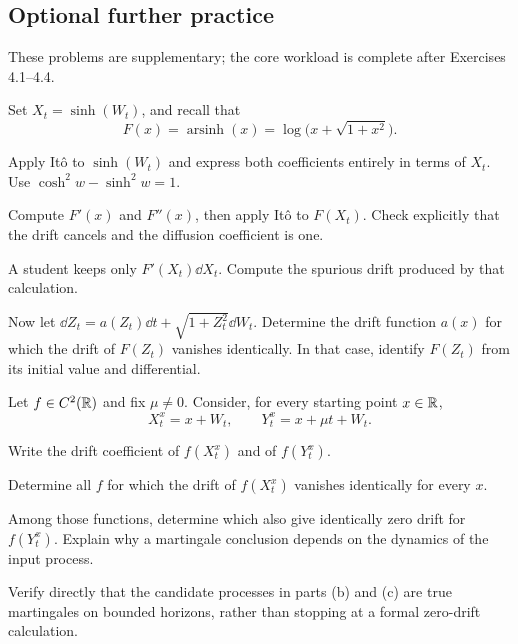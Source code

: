 \subsection*{Optional further practice}
\noindent These problems are supplementary; the core workload is complete after Exercises 4.1--4.4.
\setcounter{exercise}{4}
\begin{exercise}
Set \(X_t=\sinh(W_t)\), and recall that
\[
F(x)=\operatorname{arsinh}(x)=\log\bigl(x+\sqrt{1+x^2}\bigr).
\]
\begin{exparts}
  \item Apply It\^o to \(\sinh(W_t)\) and express both coefficients
  entirely in terms of \(X_t\). Use \(\cosh^2 w-\sinh^2 w=1\).
  \item Compute \(F'(x)\) and \(F''(x)\), then apply It\^o to
  \(F(X_t)\). Check explicitly that the drift cancels and the diffusion
  coefficient is one.
  \item A student keeps only \(F'(X_t)\dd X_t\). Compute the spurious
  drift produced by that calculation.
  \item Now let \(\dd Z_t=a(Z_t)\dd t+\sqrt{1+Z_t^2}\dd W_t\).
  Determine the drift function \(a(x)\) for which the drift of
  \(F(Z_t)\) vanishes identically. In that case, identify \(F(Z_t)\)
  from its initial value and differential.
\end{exparts}
\end{exercise}

\begin{exercise}
Let \(f\in C^2(\mathbb{R})\) and fix \(\mu\neq0\). Consider, for every starting
point \(x\in\mathbb{R}\),
\[
X_t^x=x+W_t,
\qquad
Y_t^x=x+\mu t+W_t.
\]
\begin{exparts}
  \item Write the drift coefficient of \(f(X_t^x)\) and of
  \(f(Y_t^x)\).
  \item Determine all \(f\) for which the drift of \(f(X_t^x)\)
  vanishes identically for every \(x\).
  \item Among those functions, determine which also give identically
  zero drift for \(f(Y_t^x)\). Explain why a martingale conclusion
  depends on the dynamics of the input process.
  \item Verify directly that the candidate processes in parts (b) and
  (c) are true martingales on bounded horizons, rather than stopping at
  a formal zero-drift calculation.
\end{exparts}
\end{exercise}

